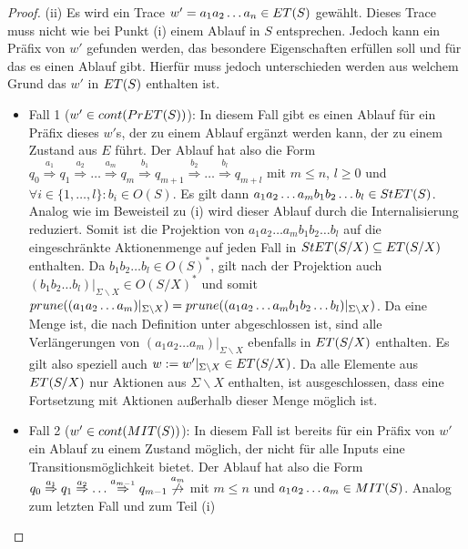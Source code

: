 \begin{proof}
  (ii)
  Es wird ein Trace $w'=a_1a_2\dots a_n\in ET{}(S)$ gewählt. Dieses Trace
  muss nicht wie bei Punkt (i) einem Ablauf in $S$ entsprechen. Jedoch kann ein
  Präfix von $w'$ gefunden werden, das besondere Eigenschaften erfüllen soll
  und für das es einen Ablauf gibt. Hierfür muss jedoch unterschieden werden
  aus welchem Grund das $w'$ in $ET{}(S)$ enthalten ist.
  \begin{itemize}
    \item Fall 1 ($w'\in cont{}(PrET{}(S))$): In diesem Fall gibt es einen
      Ablauf für ein Präfix dieses $w'$s, der zu einem Ablauf ergänzt werden
      kann, der zu einem Zustand aus $E$ führt. Der Ablauf hat also die Form $q_0
      \overset{a_1}{\Rightarrow} q_1 \overset{a_2}{\Rightarrow} \dots
      \overset{a_m}{\Rightarrow} q_m \overset{b_1}{\Rightarrow} q_{m+1}
      \overset{b_2}{\Rightarrow} \dots \overset{b_l}{\Rightarrow} q_{m+l}$ mit
      $m\leq n$, $l\geq 0$ und $\forall i\in \{1,\dots ,l\}: b_i\in O(S)$. Es
      gilt dann $a_1a_2\dots a_mb_1b_2\dots b_l\in StET{}(S)$. Analog wie im
      Beweisteil zu (i) wird dieser Ablauf durch die Internalisierung
      reduziert. Somit ist die Projektion von $a_1a_2\dots a_mb_1b_2\dots b_l$
      auf die eingeschränkte Aktionenmenge auf jeden Fall in $StET{}(S/X)
      \subseteq ET{}(S/X)$ enthalten. Da $b_1b_2\dots b_l\in O(S)^*$, gilt
      nach der Projektion auch $(b_1b_2\dots b_l)|_{\Sigma\backslash X}\in
      O(S/X)^*$ und somit $prune{}((a_1a_2\dots a_m)|_{\Sigma\backslash
      X})=prune{}((a_1a_2\dots a_mb_1b_2\dots b_l)|_{\Sigma\backslash X})$. Da
      \ET{} eine Menge ist, die nach Definition unter \cont{}
      abgeschlossen ist, sind alle Verlängerungen von $(a_1a_2\dots
      a_m)|_{\Sigma\backslash X}$ ebenfalls in $ET{}(S/X)$ enthalten.
      Es gilt also speziell auch $w:=w'|_{\Sigma\backslash X}\in
      ET{}(S/X)$. Da alle Elemente aus $ET{}(S/X)$ nur Aktionen aus
      $\Sigma\backslash X$ enthalten, ist ausgeschlossen, dass eine
      Fortsetzung mit Aktionen außerhalb dieser Menge möglich ist.
    \item Fall 2 ($w'\in cont{}(MIT{}(S))$): In diesem Fall ist bereits für
      ein Präfix von $w'$ ein Ablauf zu einem Zustand möglich, der nicht für
      alle Inputs eine Transitionsmöglichkeit bietet. Der Ablauf hat also die
      Form $q_0 \overset{a_1}{\Rightarrow} q_1 \overset{a_2}{\Rightarrow} \dots
      \overset{a_{m-1}}{\Rightarrow} q_{m-1}
      \overset{a_m}{\not{\hspace{-0.1cm}\rightarrow}}$ mit $m\leq n$ und
      $a_1a_2\dots a_m\in MIT{}(S)$. Analog zum letzten Fall und zum Teil (i)

\end{itemize}
\end{proof}
